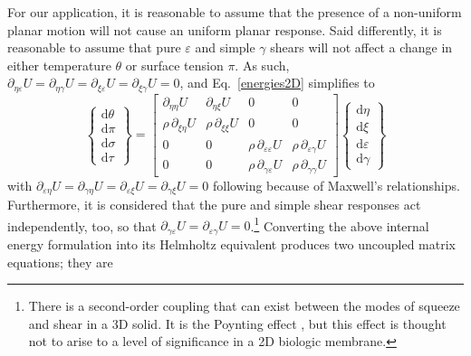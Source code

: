 For our application, it is reasonable to assume that the presence of a non-uniform planar motion will not cause an uniform planar response.  Said differently, it is reasonable to assume that pure $\varepsilon$ and simple $\gamma$ shears will not affect a change in either temperature $\theta$ or surface tension $\pi$.  As such, $\partial_{\eta\varepsilon} U = \partial_{\eta\gamma} U = \partial_{\xi\varepsilon} U = \partial_{\xi\gamma} U = 0$, and Eq.~\ref{energies2D} simplifies to
\begin{displaymath}
\left\{ \begin{matrix}
\mathrm{d} \theta \\ \mathrm{d} \pi \\
\mathrm{d} \sigma \\ \mathrm{d} \tau
\end{matrix} \right\} = \begin{bmatrix}
\partial_{\eta\eta} U & 
\partial_{\eta\xi} U & 
0 & 0 \\ 
\rho \, \partial_{\xi\eta} U & 
\rho \, \partial_{\xi\xi} U & 
0 & 0 \\
0 & 0 & 
\rho \, \partial_{\varepsilon\varepsilon} U & 
\rho \, \partial_{\varepsilon\gamma} U \\
0 & 0 & 
\rho \, \partial_{\gamma\varepsilon} U & 
\rho \, \partial_{\gamma\gamma} U 
\end{bmatrix} 
\left\{ \begin{matrix}
\mathrm{d}\eta \\ \mathrm{d} \xi \\
\mathrm{d} \varepsilon \\ \mathrm{d} \gamma
\end{matrix} \right\} 
\end{displaymath}
with $\partial_{\varepsilon\eta} U = \partial_{\gamma\eta} U = \partial_{\varepsilon\xi} U = \partial_{\gamma\xi} U = 0$ following because of Maxwell's relationships.  Furthermore, it is considered that the pure and simple shear responses act independently, too, so that $\partial_{\gamma\varepsilon} U = \partial_{\varepsilon\gamma} U = 0$.\footnote{
    There is a second-order coupling that can exist between the modes of squeeze and shear in a 3D solid.  It is the Poynting effect \cite{FreedZamani19}, but this effect is thought not to arise to a level of significance in a 2D biologic membrane.
}
Converting the above internal energy formulation into its Helmholtz equivalent produces two uncoupled matrix equations; they are

